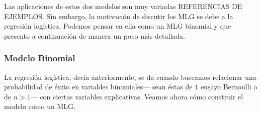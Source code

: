 Las aplicaciones de estos dos modelos son muy variadas {\color{Red} REFERENCIAS DE EJEMPLOS}. Sin embargo, la motivación de discutir los MLG se debe a la regresión logística. Podemos pensar en ella como un MLG binomial y que presento a continuación de manera un poco más detallada. 

\subsubsection*{Modelo Binomial}

La regresión logística, decía anteriormente, se da cuando buscamos relacionar una probabilidad de éxito en variables binomiales--- sean éstas de $1$ ensayo Bernoulli o de $n>1$--- con ciertas variables explicativas. Veamos ahora cómo construir el modelo como un MLG.\\

